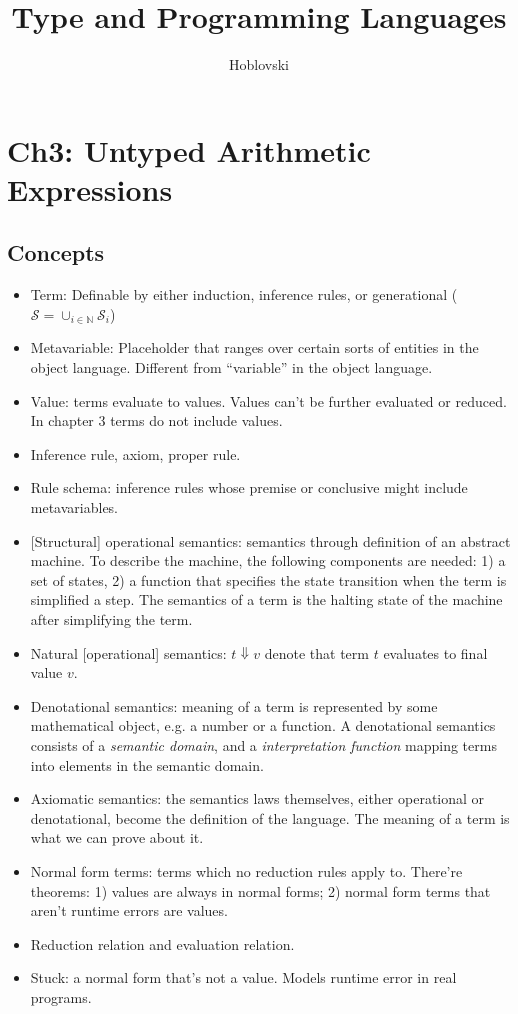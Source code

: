 \documentclass{article}
\title{Type and Programming Languages}
\author{Hoblovski}
\newcommand{\nset}{\mathbb{N}}
\begin{document}
\maketitle
\tableofcontents



\section{Ch3: Untyped Arithmetic Expressions}
\subsection{Concepts}
  \begin{itemize}
    \item Term: Definable by either induction, inference rules, or generational ($\mathcal{S} = \cup_{i \in \nset} \mathcal{S}_i$)
    \item Metavariable: Placeholder that ranges over certain sorts of entities in the object language. Different from ``variable'' in the object language.
    \item Value: terms evaluate to values. Values can't be further evaluated or reduced. In chapter 3 terms do not include values.
    \item Inference rule, axiom, proper rule.
    \item Rule schema: inference rules whose premise or conclusive might include metavariables.
    \item{} [Structural] operational semantics: semantics through definition of an abstract machine.
      To describe the machine, the following components are needed: 1) a set of states,
      2) a function that specifies the state transition when the term is simplified a step.
      The semantics of a term is the halting state of the machine after simplifying the term.
    \item{} Natural [operational] semantics: $t\Downarrow v$ denote that term $t$ evaluates to final value $v$.
    \item Denotational semantics: meaning of a term is represented by some mathematical object,
      e.g. a number or a function. A denotational semantics consists of a \emph{semantic domain}, and a
      \emph{interpretation function} mapping terms into elements in the semantic domain.
    \item Axiomatic semantics: the semantics laws themselves, either operational or denotational,
      become the definition of the language. The meaning of a term is what we can prove about it.
    \item Normal form terms: terms which no reduction rules apply to.
      There're theorems: 1) values are always in normal forms; 2) normal form terms that aren't runtime errors are values.
    \item Reduction relation and evaluation relation.
    \item Stuck: a normal form that's not a value. Models runtime error in real programs.
  \end{itemize}
\end{document}
